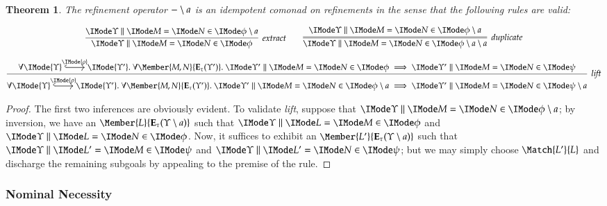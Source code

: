 \documentclass[11pt]{article}
\newtheorem{thm}{Theorem}[section]
\theoremstyle{definition}
\theoremstyle{notation}
\theoremstyle{remark}
\numberwithin{equation}{section}
\newcommand\Exprs{\mathbf{E}}
\begin{document}
\begin{thm} \label{thm:independence-comonadic}
  The refinement operator $-\setminus a$ is an idempotent comonad on refinements
  in the sense that the following rules are valid:

  \begin{gather*}
    \infer[\textit{extract}]{
      \RMemEq{\Upsilon}{M}{N}{\phi}
    }{
      \RMemEq{\Upsilon}{M}{N}{\Indep{\phi}{a}}
    }
    \qquad
    \infer=[\textit{duplicate}]{
      \RMemEq{\Upsilon}{M}{N}{\Indep{\Indep{\phi}{a}}{a}}
    }{
      \RMemEq{\Upsilon}{M}{N}{\Indep{\phi}{a}}
    }
    \\[6pt]
    \infer[\textit{lift}]{
      \forall
        \begin{tikzcd}[cramped, ampersand replacement = \&]
          \IMode{\Upsilon} \arrow[r,hook,"\IMode{\rho}"] \&\IMode{\Upsilon'}
        \end{tikzcd}.\
      \forall\Member{M,N}{\Exprs_\tau(\Upsilon')}.\
      \RMemEq{\Upsilon'}{M}{N}{\Indep{\phi}{a}}
      \implies
      \RMemEq{\Upsilon'}{M}{N}{\Indep{\psi}{a}}
    }{
      \forall
        \begin{tikzcd}[cramped, ampersand replacement = \&]
          \IMode{\Upsilon} \arrow[r,hook,"\IMode{\rho}"] \&\IMode{\Upsilon'}
        \end{tikzcd}.\
      \forall\Member{M,N}{\Exprs_\tau(\Upsilon')}.\
      \RMemEq{\Upsilon'}{M}{N}{\phi}
      \implies
      \RMemEq{\Upsilon'}{M}{N}{\psi}
    }
  \end{gather*}
\end{thm}
\begin{proof}
  The first two inferences are obviously evident. To validate \textit{lift},
  suppose that $\RMemEq{\Upsilon}{M}{N}{\Indep{\phi}{a}}$; by inversion, we
  have an $\Member{L}{\Exprs_\tau(\Upsilon\setminus a)}$ such that
  $\RMemEq{\Upsilon}{L}{M}{\phi}$ and $\RMemEq{\Upsilon}{L}{N}{\phi}$.  Now, it
  suffices to exhibit an $\Member{L'}{\Exprs_\tau(\Upsilon\setminus a)}$ such
  that $\RMemEq{\Upsilon}{L'}{M}{\psi}$ and $\RMemEq{\Upsilon}{L'}{N}{\psi}$;
  but we may simply choose $\Match{L'}{L}$ and discharge the remaining subgoals
  by appealing to the premise of the rule.
\end{proof}

\subsubsection{Nominal Necessity}
\end{document}
